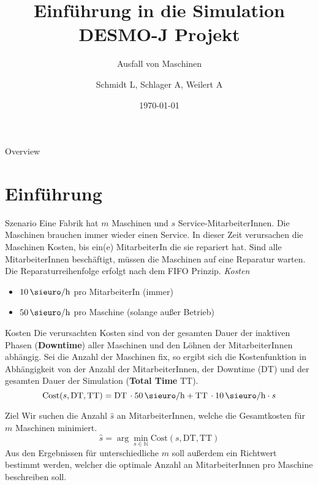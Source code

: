 \documentclass{beamer}
\title{Einführung in die Simulation\\DESMO-J Projekt}
\subtitle{Ausfall von Maschinen}
\author{Schmidt L, Schlager A, Weilert A}
\institute{Paris Lodron Universität Salzburg}
\date{\today}
\begin{document}
    \maketitle

    \begin{frame}{Overview}
        \tableofcontents
    \end{frame}

    \section{Einführung}
    \begin{frame}{Szenario}
        Eine Fabrik hat $m$ Maschinen und $s$ Service-MitarbeiterInnen.
        Die Maschinen brauchen immer wieder einen Service.
        In dieser Zeit verursachen die Maschinen Kosten, bis ein(e) MitarbeiterIn die sie repariert hat.
        Sind alle MitarbeiterInnen beschäftigt,
        müssen die Maschinen auf eine Reparatur warten.
        Die Reparaturreihenfolge erfolgt nach dem FIFO Prinzip.\vspace*{1em}\newline
        \textit{Kosten}
        \begin{itemize}
            \item $\SI{10}{\sieuro\per\hour}$ pro MitarbeiterIn (immer)
            \item $\SI{50}{\sieuro\per\hour}$ pro Maschine (solange außer Betrieb)
        \end{itemize}
    \end{frame}

    \begin{frame}{Kosten}
        Die verursachten Kosten sind von der gesamten Dauer der inaktiven Phasen (\textbf{Downtime}) aller Maschinen und den
        Löhnen der MitarbeiterInnen abhängig.
        Sei die Anzahl der Maschinen fix, so ergibt sich die Kostenfunktion in Abhängigkeit von der Anzahl der MitarbeiterInnen,
        der Downtime (DT) und der gesamten Dauer der Simulation (\textbf{Total Time} TT).
        \[
            \mathrm{Cost}(s, \text{DT}, \text{TT}) = \text{DT}\,\cdot \SI{50}{\sieuro\per\hour} + \text{TT}\,\cdot \SI{10}{\sieuro\per\hour} \cdot s
        \]
    \end{frame}

    \begin{frame}{Ziel}
        Wir suchen die Anzahl $\hat{s}$ an MitarbeiterInnen, welche die Gesamtkosten für $m$ Maschinen minimiert.
        \[
             \hat{s} = \arg\min_{s \in \mathbb{N}} \mathrm{Cost}(s, \text{DT}, \text{TT})
        \]
        Aus den Ergebnissen für unterschiedliche $m$ soll außerdem ein Richtwert bestimmt werden, welcher
        die optimale Anzahl an MitarbeiterInnen pro Maschine beschreiben soll.
    \end{frame}
\end{document}
